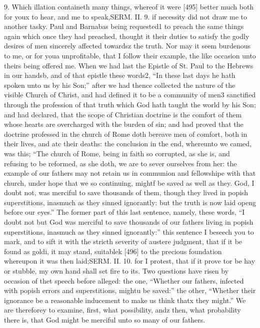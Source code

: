 9. Which illation containeth many things, whereof it were [495] better much both for youx to hear, and me to speak,SERM. II. 9. if necessity did not draw me to another tasky. Paul and Barnabas being requested1 to preach the same things again which once they had preached, thought it their duties to satisfy the godly desires of men sincerely affected towardsz the truth. Nor may it seem burdenous to me, or for youa unprofitable, that I follow their example, the like occasion unto theirs being offered me. When we had last the Epistle of St. Paul to the Hebrews in our handsb, and of that epistle these words2, “In these last days he hath spoken unto us by his Son;” after we had thence collected the nature of the visible Church of Christ, and had defined it to be a community of men3 sanctified through the profession of that truth which God hath taught the world by his Son; and had declared, that the scope of Christian doctrine is the comfort of them whose hearts are overcharged with the burden of sin; and had proved that the doctrine professed in the church of Rome doth bereave men of comfort, both in their lives, and atc their deaths: the conclusion in the end, whereunto we camed, was this; “The church of Rome, being in faith so corrupted, as she is, and refusing to be reformed, as she doth, we are to sever ourselves from her: the example of our fathers may not retain us in communion and fellowshipe with that church, under hope that we so continuing, mightf be saved as well as they. God, I doubt not, was merciful to save thousands of them, though they lived in popish superstitions, inasmuch as they sinned ignorantly: but the truth is now laid openg before our eyes.” The former part of this last sentence, namely, these words, “I doubt not but God was merciful to save thousands of our fathers living in popish superstitions, inasmuch as they sinned ignorantly:” this sentence I beseech you to mark, and to sift it with the stricth severity of austere judgment, that if it be found as goldi, it may stand, suitablek [496] to the precious foundation whereupon it was then laid;SERM. II. 10. for I protest, that if it prove tor be hay or stubble, my own hand shall set fire to its. Two questions have risen by occasion of thet speech before alleged: the one, “Whether our fathers, infected with popish errors and superstitions, mightu be saved:” the other, “Whether their ignorance be a reasonable inducement to make us think thatx they might.” We are thereforey to examine, first, what possibility, andz then, what probability there is, that God might be merciful unto so many of our fathers.

